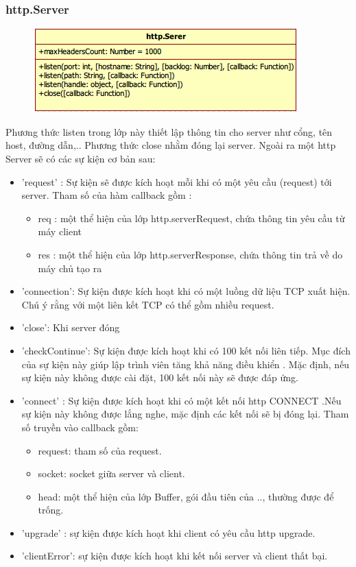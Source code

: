 	\subsubsection{http.Server}
		
		\begin{figure}[h]
			\centering
			\includegraphics[scale=0.7]{3_3_2}
		\end{figure}
		
		Phương thức listen trong lớp này thiết lập thông tin cho server như cổng, tên host, đường dẫn,.. Phương thức close nhằm đóng lại server. Ngoài ra một http Server sẽ có các sự kiện cơ bản sau:
		
		\begin{itemize}
			\item 'request' : Sự kiện sẽ được kích hoạt mỗi khi có một yêu cầu (request) tới server. Tham số của hàm callback gồm :
				\begin{itemize}
					\item req : một thể hiện của lớp http.serverRequest, chứa thông tin yêu cầu từ máy client
					\item res : một thể hiện của lớp http.serverResponse, chứa thông tin trả về do máy chủ tạo ra
				\end{itemize}
			\item 'connection': Sự kiện được kích hoạt khi có một luồng dữ liệu TCP xuất hiện. Chú ý rằng với một liên kết TCP có thể gồm nhiều request.
			\item 'close': Khi server đóng
			\item 'checkContinue': Sự kiện được kích hoạt khi có 100  kết nối liên tiếp. Mục đích của sự kiện này giúp lập trình viên tăng khả năng điều khiển . Mặc định, nếu sự kiện này không được cài đặt, 100 kết nối này sẽ được đáp ứng.
			\item 'connect' : Sự kiện được kích hoạt khi có một kết nối http CONNECT .Nếu sự kiện này không được  lắng nghe, mặc định các kết nối sẽ bị đóng lại. Tham số truyền vào callback gồm:
			\begin{itemize}
				\item request: tham số của request.
				\item socket: socket giữa server và client.
				\item head: một thể hiện của lớp Buffer, gói đầu tiên của .., thường được để trống.
			\end{itemize}

			\item 'upgrade' : sự kiện được kích hoạt khi client có yêu cầu http upgrade.
			\item 'clientError': sự kiện được kích hoạt khi kết nối server và client thất bại.
		\end{itemize}
		
